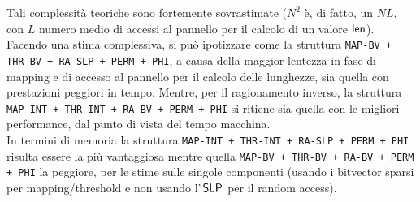 Tali complessità teoriche sono fortemente sovrastimate ($N^2$ è, di fatto, un
$\mathit{NL}$, con $L$ numero medio di accessi al pannello per il calcolo di un
valore $\mbox{\rm {\sf len}}$). \\ 
Facendo una stima complessiva, si può ipotizzare come la struttura
\texttt{MAP-BV 
+ THR-BV + RA-SLP + PERM + PHI}, a causa della maggior lentezza in fase di
mapping e di accesso al pannello per il calcolo delle lunghezze, sia quella con
prestazioni peggiori in tempo. Mentre, per il ragionamento inverso, la
struttura 
\texttt{MAP-INT + THR-INT + RA-BV + PERM + PHI} si ritiene sia quella con le
migliori performance, dal punto di vista del tempo macchina.\\
In termini di memoria la struttura
\texttt{MAP-INT + THR-INT + RA-SLP + PERM + PHI} risulta essere la più
vantaggiosa mentre quella
\texttt{MAP-BV + THR-BV + RA-BV + PERM + PHI} la peggiore, per le stime sulle
singole componenti (usando i bitvector sparsi per mapping/threshold e non
usando l'$\,\mbox{\rm {\sf SLP}}$ per il random access). 
